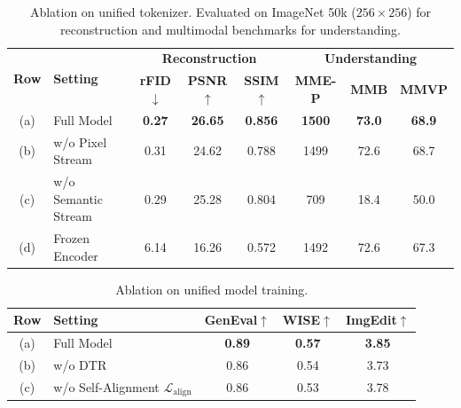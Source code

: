 \documentclass[runningheads]{llncs}
\begin{document}
\begin{table}[t]
\small
\centering
\caption{Ablation on unified tokenizer. Evaluated on ImageNet 50k ($256 \times 256$) for reconstruction and multimodal benchmarks for understanding.}
\vspace{-10pt}
\begin{tabular}{clcccccc}
\toprule
\multirow{2}{*}{\textbf{Row}} & \multirow{2}{*}{\textbf{Setting}} & \multicolumn{3}{c}{\textbf{Reconstruction}} & \multicolumn{3}{c}{\textbf{Understanding}} \\
& & \textbf{rFID}$\downarrow$ & \textbf{PSNR}$\uparrow$ & \textbf{SSIM}$\uparrow$ & \textbf{MME-P} & \textbf{MMB} & \textbf{MMVP} \\ \midrule
(a) & Full Model & \textbf{0.27} & \textbf{26.65} & \textbf{0.856} & \textbf{1500} & \textbf{73.0} & \textbf{68.9} \\
(b) & w/o Pixel Stream & 0.31 & 24.62 & 0.788 & 1499 & 72.6 & 68.7 \\
(c) & w/o Semantic Stream & 0.29 & 25.28 & 0.804 & 709 & 18.4 & 50.0 \\
(d) & Frozen Encoder & 6.14 & 16.26 & 0.572 & 1492 & 72.6 & 67.3 \\
\bottomrule
\end{tabular}
\label{tab:abl_arch}
\end{table}

\begin{table}[t]
\small
\centering
\caption{Ablation on unified model training.}
\vspace{-10pt}
\begin{tabular}{clccc}
\toprule
\textbf{Row} & \textbf{Setting} & \textbf{GenEval}$\uparrow$ & \textbf{WISE}$\uparrow$ & \textbf{ImgEdit}$\uparrow$ \\ \midrule
(a) & Full Model & \textbf{0.89} & \textbf{0.57} & \textbf{3.85} \\
(b) & w/o DTR & 0.86 & 0.54 & 3.73 \\
(c) & w/o Self-Alignment $\mathcal{L}_{\text{align}}$ & 0.86 & 0.53 & 3.78 \\
\bottomrule
\end{tabular}
\label{tab:abl_dtr}
\end{table}
\end{document}
